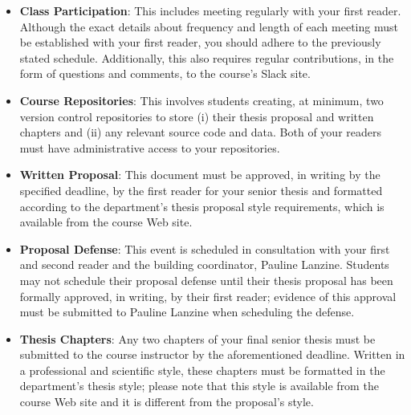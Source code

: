 \begin{itemize}
  \itemsep -.25em

  \item {\bf Class Participation}: This includes meeting regularly with your first reader. Although the exact details
    about frequency and length of each meeting must be established with your first reader, you should adhere to the
    previously stated schedule. Additionally, this also requires regular contributions, in the form of questions and
    comments, to the course's Slack site.

  \item {\bf Course Repositories}: This involves students creating, at minimum, two version control repositories to
    store (i) their thesis proposal and written chapters and (ii) any relevant source code and data.  Both of your
    readers must have administrative access to your repositories.


  \item {\bf Written Proposal}: This document must be approved, in writing by the specified deadline, by the first
    reader for your senior thesis and formatted according to the department's thesis proposal style requirements,
    which is available from the course Web site.

  \item {\bf Proposal Defense}: This event is scheduled in consultation with your first and second reader and the
    building coordinator, Pauline Lanzine. Students may not schedule their proposal defense until their thesis proposal
    has been formally approved, in writing, by their first reader; evidence of this approval must be submitted to
    Pauline Lanzine when scheduling the defense.

  \item {\bf Thesis Chapters}: Any two chapters of your final senior thesis must be submitted to the course instructor
    by the aforementioned deadline.  Written in a professional and scientific style, these chapters must be formatted in
    the department's thesis style; please note that this style is available from the course Web site and it is different
    from the proposal's style.

\end{itemize}

